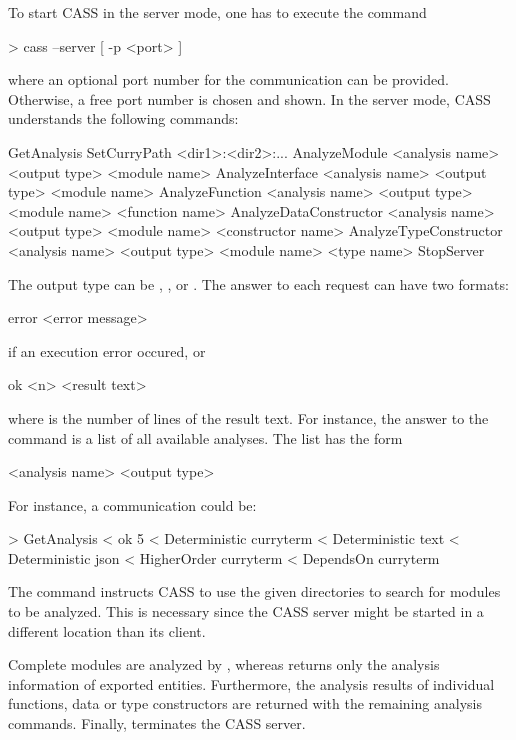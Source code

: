 To start CASS in the server mode, one has to execute the command
\begin{curry}
> cass --server [ -p <port> ]
\end{curry}
where an optional port number for the communication can be
provided. Otherwise, a free port number is chosen and shown. In the
server mode, CASS understands the following commands:
\begin{curry}
GetAnalysis
SetCurryPath <dir1>:<dir2>:...
AnalyzeModule          <analysis name> <output type> <module name>
AnalyzeInterface       <analysis name> <output type> <module name>
AnalyzeFunction        <analysis name> <output type> <module name> <function name>
AnalyzeDataConstructor <analysis name> <output type> <module name> <constructor name>
AnalyzeTypeConstructor <analysis name> <output type> <module name> <type name>
StopServer
\end{curry}
The output type can be , , or .
The answer to each request can have two formats:
\begin{curry}
error <error message>
\end{curry}
if an execution error occured, or
\begin{curry}
ok <n>
<result text>
\end{curry}
where  is the number of lines of the result text.
For instance, the answer to the command 
is a list of all available analyses. The list has the form
\begin{curry}
<analysis name> <output type>
\end{curry}
For instance, a communication could be:
\begin{curry}
> GetAnalysis
< ok 5
< Deterministic curryterm
< Deterministic text
< Deterministic json
< HigherOrder   curryterm
< DependsOn     curryterm
\end{curry}
The command  instructs CASS to use the given
directories to search for modules to be analyzed. This is necessary
since the CASS server might be started in a different location than
its client.

Complete modules are analyzed by , whereas
 returns only the analysis information of exported
entities. Furthermore, the analysis results of individual functions,
data or type constructors are returned with the remaining analysis
commands. Finally,  terminates the CASS server.

